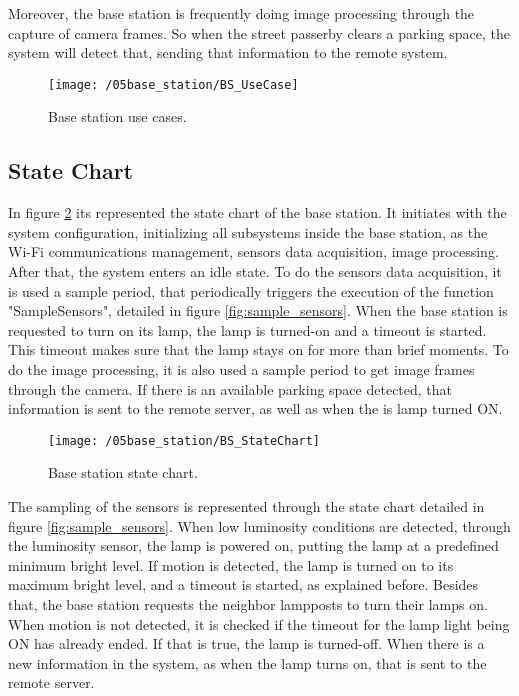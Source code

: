Moreover, the base station is frequently doing image processing through the capture of camera frames. So when the street passerby clears a parking space, the system will detect that, sending that information to the remote system.

\begin{figure}[ht] 
	\centering
	\texttt{[image: /05base\_station/BS\_UseCase]}
	\caption{Base station use cases.}
	\label{fig:bs_use_cases}
\end{figure}

\subsection{State Chart}
In figure \ref{fig:bs_state_chart} its represented the state chart of the base station. It initiates with the system configuration, initializing all subsystems inside the base station, as the Wi-Fi communications management, sensors data acquisition, image processing. After that, the system enters an idle state. To do the sensors data acquisition, it is used a sample period, that periodically triggers the execution of the function "SampleSensors", detailed in figure \ref{fig:sample_sensors}. When the base station is requested to turn on its lamp, the lamp is turned-on and a timeout is started. This timeout makes sure that the lamp stays on for more than brief moments. To do the image processing, it is also used a sample period to get image frames through the camera. If there is an available parking space detected, that information is sent to the remote server, as well as when the is lamp turned ON.

\begin{figure}[ht]
	\centering
	\texttt{[image: /05base\_station/BS\_StateChart]}
	\caption{Base station state chart.}
	\label{fig:bs_state_chart}
\end{figure}

\clearpage
The sampling of the sensors is represented through the state chart detailed in figure \ref{fig:sample_sensors}. When low luminosity conditions are detected, through the luminosity sensor, the lamp is powered on, putting the lamp at a predefined minimum bright level. If motion is detected, the lamp is turned on to its maximum bright level, and a timeout is started, as explained before. Besides that, the base station requests the neighbor lampposts to turn their lamps on. When motion is not detected, it is checked if the timeout for the lamp light being ON has already ended. If that is true, the lamp is turned-off. When there is a new information in the system, as when the lamp turns on, that is sent to the remote server.


